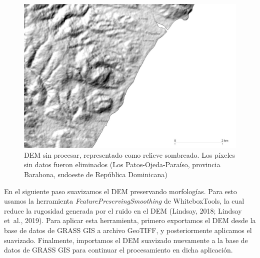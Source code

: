 \documentclass[spanish]{article}
\begin{document}
\begin{figure}

{\centering \includegraphics[width=0.8\linewidth]{figuras/dem-relleno} 

}

\caption{DEM sin procesar, representado como relieve sombreado. Los píxeles sin datos fueron eliminados (Los Patos-Ojeda-Paraíso, provincia Barahona, sudoeste de República Dominicana)}\label{fig:demrelleno}
\end{figure}

En el siguiente paso suavizamos el DEM preservando morfologías. Para
esto usamos la herramienta \emph{FeaturePreservingSmoothing} de
WhiteboxTools, la cual reduce la rugosidad generada por el ruido en el
DEM (Lindsay, 2018; Lindsay et~al., 2019). Para aplicar esta
herramienta, primero exportamos el DEM desde la base de datos de GRASS
GIS a archivo GeoTIFF, y posteriormente aplicamos el suavizado.
Finalmente, importamos el DEM suavizado nuevamente a la base de datos de
GRASS GIS para continuar el procesamiento en dicha aplicación.
\end{document}
